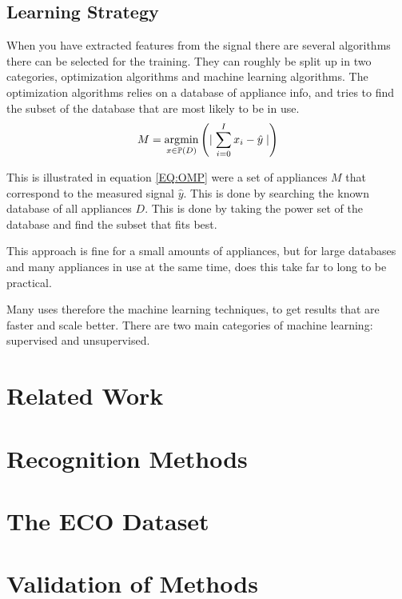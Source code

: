 \subsection{Learning Strategy} 
When you have extracted features from the signal there are several algorithms there can be selected for the training. They can roughly be split up in two categories, optimization algorithms and machine learning algorithms. The optimization algorithms relies on a database of appliance info, and tries to find the subset of the database that are most likely to be in use. 
\begin{equation}
	M = \operatorname*{\arg\!\min}_{x \in \mathbb{P}(D) } \left( \mid {\sum_{i = 0}^{I} x_i - \hat{y}  \mid} \right)
	\label{EQ:OMP}
\end{equation}

This is illustrated in equation \ref{EQ:OMP} were a set of appliances $M$ that correspond to the measured signal $\hat{y}$. This is done by searching the known database of all appliances $D$. This is done by taking the power set of the database and find the subset that fits best. 

This approach is fine for a small amounts of appliances, but for large databases and many appliances in use at the same time, does this take far to long to be practical. 

Many uses therefore the machine learning techniques, to get results that are faster and scale better. There are two main categories of machine learning: supervised and unsupervised. 





\section{Related Work} 

			

\section{Recognition Methods} 


\section{The ECO Dataset} 

\section{Validation of Methods} 